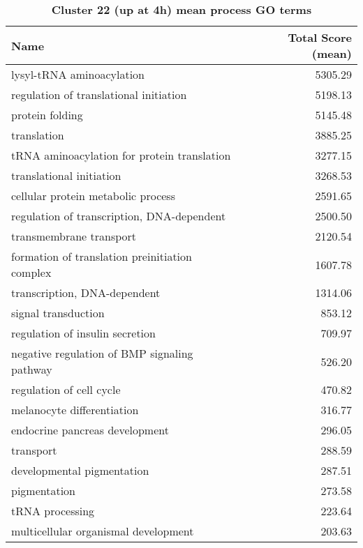 \begin{table}[hp]
\begin{center} \sf
\begin{tabular}{p{}r}
\toprule
\textbf{Name}                                  & \textbf{Total Score (mean)} \\ \midrule
lysyl-tRNA aminoacylation                      & 5305.29                     \\
regulation of translational initiation         & 5198.13                     \\
protein folding                                & 5145.48                     \\
translation                                    & 3885.25                     \\
tRNA aminoacylation for protein translation    & 3277.15                     \\
translational initiation                       & 3268.53                     \\
cellular protein metabolic process             & 2591.65                     \\
regulation of transcription, DNA-dependent     & 2500.50                     \\
transmembrane transport                        & 2120.54                     \\
formation of translation preinitiation complex & 1607.78                     \\
transcription, DNA-dependent                   & 1314.06                     \\
signal transduction                            & 853.12                      \\
regulation of insulin secretion                & 709.97                      \\
negative regulation of BMP signaling pathway   & 526.20                      \\
regulation of cell cycle                       & 470.82                      \\
melanocyte differentiation                     & 316.77                      \\
endocrine pancreas development                 & 296.05                      \\
transport                                      & 288.59                      \\
developmental pigmentation                     & 287.51                      \\
pigmentation                                   & 273.58                      \\
tRNA processing                                & 223.64                      \\
multicellular organismal development           & 203.63                      \\ \bottomrule
\end{tabular}
\end{center}

\caption[Cluster 22 (up at 4h) mean process GO terms]{\sf \textbf{Cluster 22 (up at 4h) mean process GO terms}}
\label{tab:cls22-process}
\end{table}